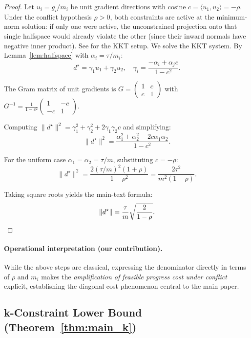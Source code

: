 \documentclass{article}
\theoremstyle{plain}
\theoremstyle{definition}
\theoremstyle{remark}
\begin{document}
\begin{proof}
Let $u_i = g_i/m_i$ be unit gradient directions with cosine $c = \langle u_1, u_2 \rangle = -\rho$. Under the conflict hypothesis $\rho > 0$, both constraints are active at the minimum-norm solution: if only one were active, the unconstrained projection onto that single halfspace would already violate the other (since their inward normals have negative inner product). See \citealt[Sec.~3.2]{boyd2004convex} for the KKT setup.
We solve the KKT system. By Lemma~\ref{lem:halfspace} with $\alpha_i = \tau/m_i$:
\[
d^\star = \gamma_1 u_1 + \gamma_2 u_2, \quad
\gamma_i = \frac{-\alpha_i + \alpha_j c}{1-c^2}.
\]

The Gram matrix of unit gradients is
$G = \begin{pmatrix} 1 & c \\ c & 1 \end{pmatrix}$
with $G^{-1} = \frac{1}{1-c^2}\begin{pmatrix} 1 & -c \\ -c & 1 \end{pmatrix}$.

Computing $\|d^\star\|^2 = \gamma_1^2 + \gamma_2^2 + 2\gamma_1 \gamma_2 c$ and simplifying:
\[
\|d^\star\|^2 = \frac{\alpha_1^2 + \alpha_2^2 - 2c\alpha_1\alpha_2}{1-c^2}.
\]

For the uniform case $\alpha_1 = \alpha_2 = \tau/m$, substituting $c = -\rho$:
\[
\|d^\star\|^2 = \frac{2(\tau/m)^2(1+\rho)}{1-\rho^2} = \frac{2\tau^2}{m^2(1-\rho)}.
\]

Taking square roots yields the main-text formula:
\[
\|d^\star\| = \frac{\tau}{m}\sqrt{\frac{2}{1-\rho}}. \qedhere
\]
\end{proof}

\paragraph{Operational interpretation (our contribution).}
While the above steps are classical,
expressing the denominator directly in terms of $\rho$ and $m_i$
makes the \textit{amplification of feasible progress cost under conflict} explicit,
establishing the diagonal cost phenomenon central to the main paper.

\subsection{k-Constraint Lower Bound (Theorem~\ref{thm:main_k})}\label{app:k_bound}
\end{document}
